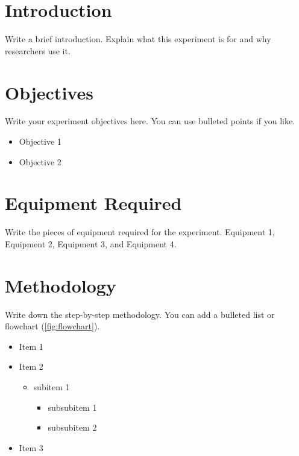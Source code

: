 \section{Introduction}
Write a brief introduction. Explain what this experiment is for and why researchers use it. 


\section{Objectives} \label{section: introduction}
Write your experiment objectives here. You can use bulleted points if you like.

\begin{itemize}
    \item Objective 1
    \item Objective 2
\end{itemize}

\section{Equipment Required} 
Write the pieces of equipment required for the experiment.
Equipment 1, Equipment 2, Equipment 3, and Equipment 4.

\section{Methodology}
Write down the step-by-step methodology. You can add a bulleted list or flowchart (\cref{fig:flowchart}).

\begin{itemize}
    \item Item 1
    \item Item 2
    \begin{itemize}
        \item subitem 1
        \begin{itemize}
            \item subsubitem 1
            \item subsubitem 2
        \end{itemize}
    \end{itemize}
    \item Item 3
\end{itemize}

